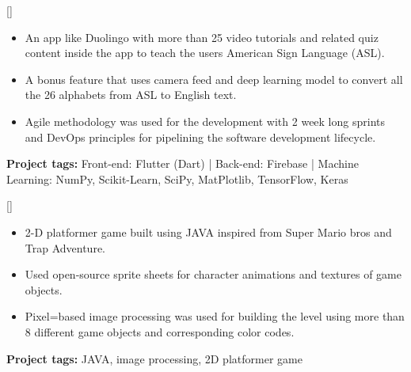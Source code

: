 \documentclass{article}
\begin{document}
[]
\begin{itemize}
\item An app like Duolingo with more than 25 video tutorials and related quiz content inside the app to teach the users American Sign Language (ASL).
\item A bonus feature that uses camera feed and deep learning model to convert all the 26 alphabets from ASL to English text.
\item Agile methodology was used for the development with 2 week long sprints and DevOps principles for pipelining the software development lifecycle.
\end{itemize}
\textbf{Project tags:} 
Front-end: Flutter (Dart) | Back-end: Firebase | Machine Learning: NumPy, Scikit-Learn, SciPy, MatPlotlib, TensorFlow, Keras


[]
\item
\begin{itemize}
\item 2-D platformer game built using JAVA inspired from Super Mario bros and Trap Adventure.
\item Used open-source sprite sheets for character animations and textures of game objects.
\item Pixel=based image processing was used for building the level using more than 8 different game objects and corresponding color codes.

\end{itemize}
\textbf{Project tags:} JAVA, image processing, 2D platformer game

\end{document}
